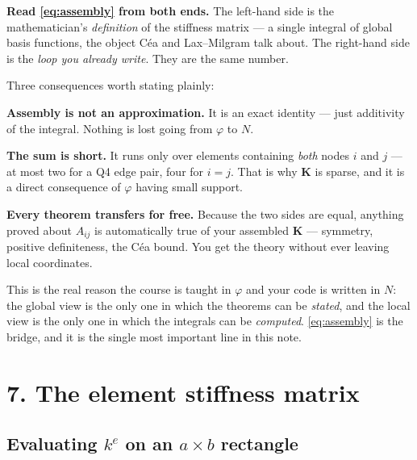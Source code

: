 \documentclass[11pt]{article}
\begin{document}
\medskip
\textbf{Read \eqref{eq:assembly} from both ends.} The left-hand side is the
mathematician's \emph{definition} of the stiffness matrix --- a single integral
of global basis functions, the object C\'ea and Lax--Milgram talk about. The
right-hand side is the \emph{loop you already write}. They are the same number.

\medskip
Three consequences worth stating plainly:
\begin{steps}
\item \textbf{Assembly is not an approximation.} It is an exact identity ---
      just additivity of the integral. Nothing is lost going from $\varphi$ to
      $N$.
\item \textbf{The sum is short.} It runs only over elements containing
      \emph{both} nodes $i$ and $j$ --- at most two for a Q4 edge pair, four
      for $i=j$. That is why $\bm{K}$ is sparse, and it is a direct consequence
      of $\varphi$ having small support.
\item \textbf{Every theorem transfers for free.} Because the two sides are
      equal, anything proved about $A_{ij}$ is automatically true of your
      assembled $\bm{K}$ --- symmetry, positive definiteness, the C\'ea bound.
      You get the theory without ever leaving local coordinates.
\end{steps}

\medskip
{\small\color{black!60}This is the real reason the course is taught in
$\varphi$ and your code is written in $N$: the global view is the only one in
which the theorems can be \emph{stated}, and the local view is the only one in
which the integrals can be \emph{computed}. \eqref{eq:assembly} is the bridge,
and it is the single most important line in this note.}

\section*{7. The element stiffness matrix}

\subsection*{Evaluating $k^{e}$ on an $a\times b$ rectangle}
\end{document}
